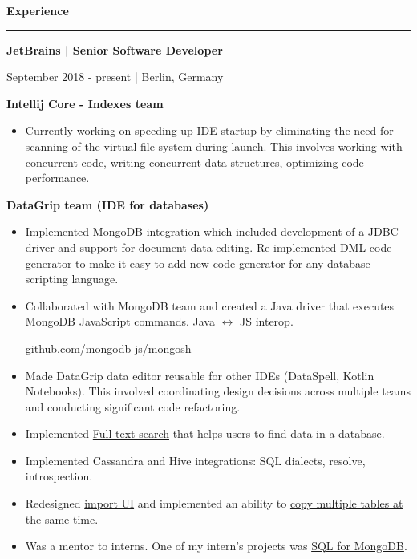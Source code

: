 \documentclass[9pt]{article}
\begin{document}
\begin{multicols}{2}
{\textbf{Experience}}

\vspace{0.5em}

\hrule

\vspace{1em}

{\textbf{JetBrains | Senior Software Developer}}

\color{gray} September 2018 - present | Berlin, Germany \color{black}

\vspace{1.3em}
\hspace{2.2em} {\textbf{Intellij Core - Indexes team}}
\begin{itemize}
    \item Currently working on speeding up IDE startup by eliminating the need for scanning of the virtual file system during launch. This involves working with concurrent code, writing concurrent data structures, optimizing code performance.
\end{itemize}

\vspace{0.8em}
\hspace{2.2em} {\textbf{DataGrip team (IDE for databases)}}
\begin{itemize}
\item Implemented \href{https://www.jetbrains.com/datagrip/whatsnew/2019-3/#version-2019-3-mongodb-support}{MongoDB integration} which included development of a JDBC driver and support for \href{https://www.jetbrains.com/datagrip/whatsnew/2021-1/#version-2021-1-data-editor}{document data editing}. Re-implemented DML code-generator to make it easy to add new code generator for any database scripting language.
\item Collaborated with MongoDB team and created a Java driver that executes MongoDB JavaScript commands. Java \(\leftrightarrow\) JS interop.

\href{https://github.com/mongodb-js/mongosh/tree/main/packages/java-shell}{github.com/mongodb-js/mongosh}
\item Made DataGrip data editor reusable for other IDEs (DataSpell, Kotlin Notebooks). This involved coordinating design decisions across multiple teams and conducting significant code refactoring.
\item Implemented \href{https://www.jetbrains.com/datagrip/whatsnew/2019-2/#version-2019-2-full-text-search}{Full-text search} that helps users to find data in a database.
\item Implemented Cassandra and Hive integrations: SQL dialects, resolve, introspection.
\item Redesigned \href{https://www.jetbrains.com/datagrip/whatsnew/2021-3/#importexport}{import UI} and implemented an ability to \href{https://www.jetbrains.com/datagrip/whatsnew/2022-1/#importexport}{copy multiple tables at the same time}.
\item Was a mentor to interns. One of my intern's projects was \href{https://www.jetbrains.com/datagrip/whatsnew/2020-3/#version-2020-3-sql-for-mongodb}{SQL for MongoDB}.
\end{itemize}


\end{multicols}
\end{document}
